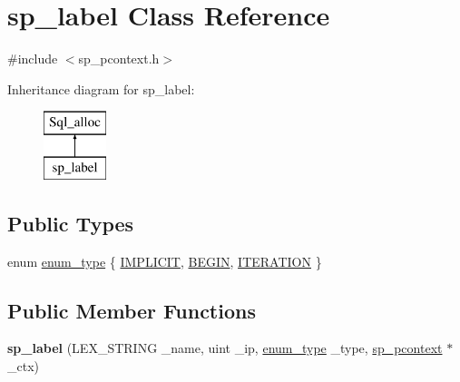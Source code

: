 \hypertarget{classsp__label}{}\section{sp\+\_\+label Class Reference}
\label{classsp__label}


{\ttfamily \#include $<$sp\+\_\+pcontext.\+h$>$}

Inheritance diagram for sp\+\_\+label\+:\begin{figure}[H]
\begin{center}
\leavevmode
\includegraphics[height=2.000000cm]{classsp__label}
\end{center}
\end{figure}
\subsection*{Public Types}
\begin{DoxyCompactItemize}
\item 
enum \mbox{\hyperlink{classsp__label_af128ff1711a8107a6b4a073e547f52d9}{enum\+\_\+type}} \{ \mbox{\hyperlink{classsp__label_af128ff1711a8107a6b4a073e547f52d9a27e35250ec5dd2981b7d0bc7cddc8cfe}{I\+M\+P\+L\+I\+C\+IT}}, 
\mbox{\hyperlink{classsp__label_af128ff1711a8107a6b4a073e547f52d9af3bc24a675f157c25918afd3bbf85d5d}{B\+E\+G\+IN}}, 
\mbox{\hyperlink{classsp__label_af128ff1711a8107a6b4a073e547f52d9a687bfbb0d69ffbcd044922649d2e3c0d}{I\+T\+E\+R\+A\+T\+I\+ON}}
 \}
\end{DoxyCompactItemize}
\subsection*{Public Member Functions}
\begin{DoxyCompactItemize}
\item 
\mbox{\label{classsp__label_aeb01309b6afc217a583033147f376bc7}} 
{\bfseries sp\+\_\+label} (L\+E\+X\+\_\+\+S\+T\+R\+I\+NG \+\_\+name, uint \+\_\+ip, \mbox{\hyperlink{classsp__label_af128ff1711a8107a6b4a073e547f52d9}{enum\+\_\+type}} \+\_\+type, \mbox{\hyperlink{classsp__pcontext}{sp\+\_\+pcontext}} $\ast$\+\_\+ctx)
\end{DoxyCompactItemize}
